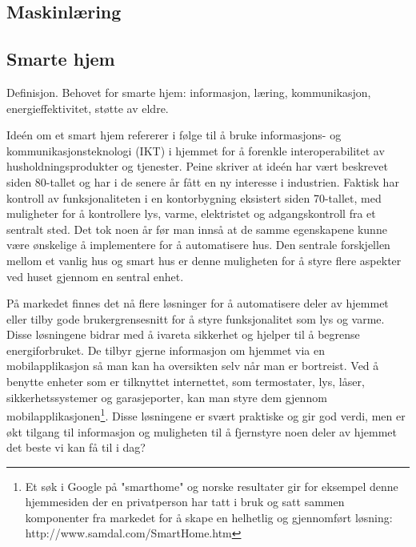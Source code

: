 \subsection{Maskinlæring}

\subsection*{Smarte hjem}
Definisjon. Behovet for smarte hjem: informasjon, læring, kommunikasjon, energieffektivitet, støtte av eldre.

Ideén om et smart hjem refererer i følge \citet{peine08} til å bruke informasjons- og kommunikasjonsteknologi (IKT) i hjemmet for å forenkle interoperabilitet av husholdningsprodukter og tjenester. Peine skriver at ideén har vært beskrevet siden 80-tallet og har i de senere år fått en ny interesse i industrien. Faktisk har kontroll av funksjonaliteten i en kontorbygning eksistert siden 70-tallet, med muligheter for å kontrollere lys, varme, elektristet og adgangskontroll fra et sentralt sted. Det tok noen år før man innså at de samme egenskapene kunne være ønskelige å implementere for å automatisere hus. Den sentrale forskjellen mellom et vanlig hus og smart hus er denne muligheten for å styre flere aspekter ved huset gjennom en sentral enhet.

På markedet finnes det nå flere løsninger for å automatisere deler av hjemmet eller tilby gode brukergrensesnitt for å styre funksjonalitet som lys og varme. Disse løsningene bidrar med å ivareta sikkerhet og hjelper til å begrense energiforbruket. De tilbyr gjerne informasjon om hjemmet via en mobilapplikasjon så man kan ha oversikten selv når man er bortreist. Ved å benytte enheter som er tilknyttet internettet, som termostater, lys, låser, sikkerhetssystemer og garasjeporter, kan man styre dem gjennom mobilapplikasjonen\footnote{Et søk i Google på "smarthome" og norske resultater gir for eksempel denne hjemmesiden der en privatperson har tatt i bruk og satt sammen komponenter fra markedet for å skape en helhetlig og gjennomført løsning: http://www.samdal.com/SmartHome.htm}. Disse løsningene er svært praktiske og gir god verdi, men er økt tilgang til informasjon og muligheten til å fjernstyre noen deler av hjemmet det beste vi kan få til i dag?

